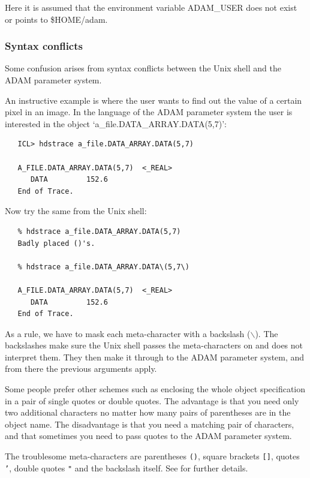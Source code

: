    Here it is assumed that the environment variable ADAM\_USER does not
   exist or points to \$HOME/adam.


\subsubsection{\label{paramssyntax}Syntax conflicts}

   Some confusion arises from syntax conflicts between the Unix shell
   and the ADAM parameter system.

   An instructive example is where the user wants to find out the value
   of a certain pixel in an image. In the language of
   the ADAM parameter system the user is interested in the object
   `a\_file.DATA\_ARRAY.DATA(5,7)':

\begin{verbatim}
   ICL> hdstrace a_file.DATA_ARRAY.DATA(5,7)

   A_FILE.DATA_ARRAY.DATA(5,7)  <_REAL>
      DATA         152.6
   End of Trace.
\end{verbatim}

   Now try the same from the Unix shell:

\begin{verbatim}
   % hdstrace a_file.DATA_ARRAY.DATA(5,7)
   Badly placed ()'s.

   % hdstrace a_file.DATA_ARRAY.DATA\(5,7\)

   A_FILE.DATA_ARRAY.DATA(5,7)  <_REAL>
      DATA         152.6
   End of Trace.
\end{verbatim}

   As a rule, we have to mask each meta-character with a backslash
   ($\backslash$). The backslashes make
   sure the Unix shell passes the meta-characters on and does not
   interpret them. They then make it through to the ADAM parameter
   system, and from there the previous arguments apply.

   Some people prefer other schemes such as enclosing the whole
   object specification in a pair of single quotes or double
   quotes. The advantage is that you need only two additional
   characters no matter how many pairs of parentheses are in the
   object name. The disadvantage is that you need a matching pair of
   characters, and that sometimes you need to pass quotes to the ADAM
   parameter system.

   The troublesome meta-characters are parentheses {\tt ()}, square
   brackets {\tt []}, quotes {\tt '}, double quotes {\tt "} and the
   backslash itself.  See  for further details.

